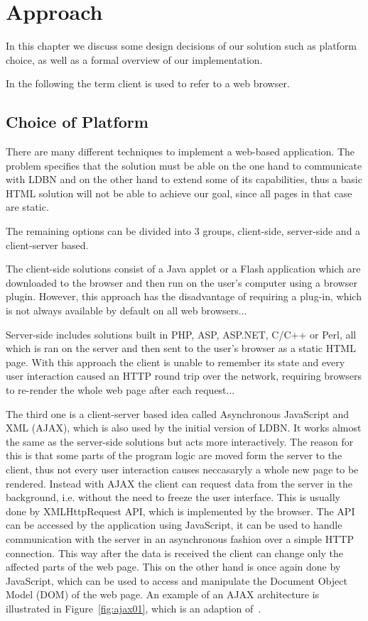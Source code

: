 \chapter{Approach}
\label{chap:approach}
In this chapter we discuss some design decisions of our solution such as 
platform choice, as well as a formal overview of our implementation. 

In the following the term client is used to refer to a web browser.


\section{Choice of Platform}
\label{sec:platform}
There are many different techniques to implement a web-based application. 
The problem specifies that the solution must be able  on the one hand to 
communicate with LDBN 
and on the other hand to extend some of its capabilities, 
thus a basic HTML solution will not be able to achieve our goal, 
since all pages in that case are static. 

The remaining options can be divided into 3 groups, client-side, server-side and
a client-server based. 

The client-side solutions consist of a Java applet or a Flash
application which are downloaded to the browser and then run on the user's computer
using a browser plugin. However, this approach has the disadvantage
of requiring a plug-in, which is not always available by default on all web browsers...

Server-side includes solutions built in PHP, ASP, ASP.NET, C/C++ or
Perl, all which is ran on the server and then sent to the user's browser as
a static HTML page. With this approach the client is unable to remember its state and 
every user interaction caused an HTTP round trip over the network, 
requiring browsers to re-render the whole web page after each request...

The third one is
a client-server based idea called Asynchronous JavaScript and XML (AJAX),
which is also used by the initial version of LDBN. 
It works almost the same as the server-side solutions but acts more interactively. The
reason for this is that some parts of the program logic are moved form the server
to the client, thus not every user interaction causes neccasaryly a whole new page
to be rendered. Instead with AJAX the client can request 
data from the server in the background, i.e. without the need to freeze the user interface. 
This is usually done by XMLHttpRequest API, which is implemented
by the browser. The API can be accessed by the application using JavaScript, it can be
used to handle communication with the server in an asynchronous fashion over a
simple HTTP connection.
This way after the data is received the client can change only the affected parts of the web page. 
This on the other hand is once again done by JavaScript, which 
can be used to access and manipulate the Document Object Model (DOM) of the web page.
An example of an AJAX architecture is illustrated in Figure~\ref{fig:ajax01}, 
which is an adaption of~\cite[Figure 3.1]{mt1}.

